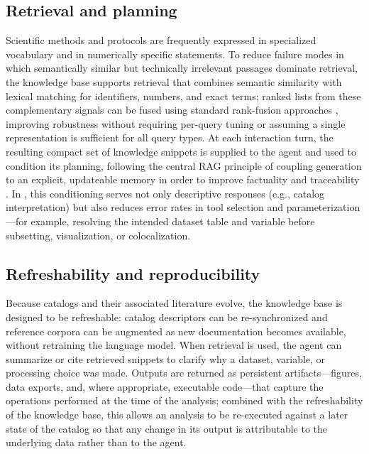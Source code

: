 \subsection{Retrieval and planning}
Scientific methods and protocols are frequently expressed in specialized vocabulary and in numerically specific statements.
To reduce failure modes in which semantically similar but technically irrelevant passages dominate retrieval, the knowledge base supports retrieval that combines semantic similarity with lexical matching for identifiers, numbers, and exact terms; ranked lists from these complementary signals can be fused using standard rank-fusion approaches \citep{Bruch2023FusionFunctions}, improving robustness without requiring per-query tuning or assuming a single representation is sufficient for all query types.
At each interaction turn, the resulting compact set of knowledge snippets is supplied to the agent and used to condition its planning, following the central RAG principle of coupling generation to an explicit, updateable memory in order to improve factuality and traceability \citep{Lewis2020RAG}.
In \cmapagent, this conditioning serves not only descriptive responses (e.g., catalog interpretation) but also reduces error rates in tool selection and parameterization---for example, resolving the intended dataset table and variable before subsetting, visualization, or colocalization.

\subsection{Refreshability and reproducibility}
Because catalogs and their associated literature evolve, the knowledge base is designed to be refreshable: catalog descriptors can be re-synchronized and reference corpora can be augmented as new documentation becomes available, without retraining the language model.
When retrieval is used, the agent can summarize or cite retrieved snippets to clarify why a dataset, variable, or processing choice was made.
Outputs are returned as persistent artifacts---figures, data exports, and, where appropriate, executable code---that capture the operations performed at the time of the analysis; combined with the refreshability of the knowledge base, this allows an analysis to be re-executed against a later state of the catalog so that any change in its output is attributable to the underlying data rather than to the agent.
